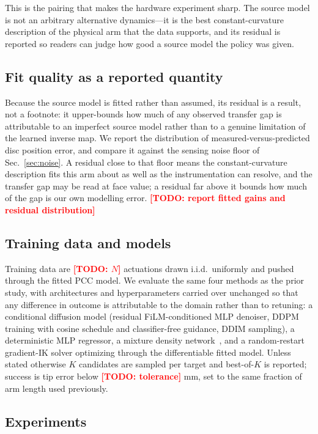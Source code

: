\documentclass[letterpaper, 10pt, conference]{ieeeconf}
\newcommand{\todo}[1]{\textcolor{red}{\textbf{[TODO: #1]}}}
\begin{document}
This is the pairing that makes the hardware experiment sharp. The source
model is not an arbitrary alternative dynamics---it is the best
constant-curvature description of the physical arm that the data supports,
and its residual is reported so readers can judge how good a source model the
policy was given.

\subsection{Fit quality as a reported quantity}

Because the source model is fitted rather than assumed, its residual is a
result, not a footnote: it upper-bounds how much of any observed transfer gap
is attributable to an imperfect source model rather than to a genuine
limitation of the learned inverse map. We report the distribution of
measured-versus-predicted disc position error, and compare it against the
sensing noise floor of Sec.~\ref{sec:noise}. A residual close to that floor
means the constant-curvature description fits this arm about as well as the
instrumentation can resolve, and the transfer gap may be read at face value; a
residual far above it bounds how much of the gap is our own modelling error.
\todo{report fitted gains and residual distribution}

\subsection{Training data and models}

Training data are \todo{$N$} actuations drawn i.i.d.\ uniformly and pushed
through the fitted PCC model. We evaluate the same four methods as the prior
study, with architectures and hyperparameters carried over unchanged so that
any difference in outcome is attributable to the domain rather than to
retuning: a conditional diffusion model (residual FiLM-conditioned MLP
denoiser, DDPM training with cosine schedule and classifier-free guidance,
DDIM sampling), a deterministic MLP regressor, a mixture density
network~\cite{bishop1994mixture}, and a random-restart gradient-IK solver
optimizing through the differentiable fitted model. Unless stated otherwise
$K$ candidates are sampled per target and best-of-$K$ is reported; success is
tip error below \todo{tolerance} mm, set to the same fraction of arm length
used previously.

\subsection{Experiments}
\end{document}
